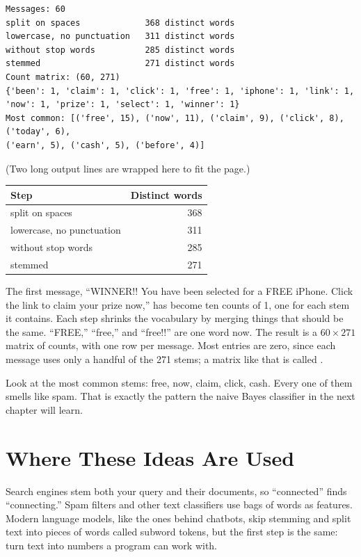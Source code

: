 \begin{verbatim}
Messages: 60
split on spaces             368 distinct words
lowercase, no punctuation   311 distinct words
without stop words          285 distinct words
stemmed                     271 distinct words
Count matrix: (60, 271)
{'been': 1, 'claim': 1, 'click': 1, 'free': 1, 'iphone': 1, 'link': 1,
'now': 1, 'prize': 1, 'select': 1, 'winner': 1}
Most common: [('free', 15), ('now', 11), ('claim', 9), ('click', 8), ('today', 6),
('earn', 5), ('cash', 5), ('before', 4)]
\end{verbatim}

(Two long output lines are wrapped here to fit the page.)

\begin{center}
\begin{tabular}{l r}
\textbf{Step} & \textbf{Distinct words} \\
\hline
split on spaces & 368 \\
lowercase, no punctuation & 311 \\
without stop words & 285 \\
stemmed & 271 \\
\end{tabular}
\end{center}

The first message, ``WINNER!! You have been selected for a FREE iPhone. Click the link to claim your prize
now,'' has become ten counts of 1, one for each stem it contains. Each step shrinks the vocabulary by merging things that should be the same. ``FREE,'' ``free,'' and ``free!!''
are one word now. The result is a $60 \times 271$ matrix of counts, with one row per message. Most entries
are zero, since each message uses only a handful of the 271 stems; a matrix like that is called
.

Look at the most common stems: free, now, claim, click, cash. Every one of them smells like spam. That is
exactly the pattern the naive Bayes classifier in the next chapter will learn.

\section{Where These Ideas Are Used}
Search engines stem both your query and their documents, so ``connected'' finds ``connecting.'' Spam filters
and other text classifiers use bags of words as features. Modern language models, like the ones behind chatbots,
skip stemming and split text into pieces of words called subword tokens, but the first step is the same:
turn text into numbers a program can work with.

